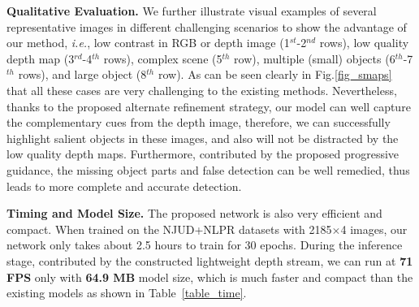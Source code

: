 \documentclass[runningheads]{llncs}
\begin{document}
\textbf{Qualitative Evaluation.} We further illustrate visual examples of several representative images in different challenging scenarios to show the advantage of our method, \textit{i.e.}, low contrast in RGB or depth image (1$^{st}$-2$^{nd}$ rows), low quality depth map (3$^{rd}$-4$^{th}$ rows), complex scene (5$^{th}$ row), multiple (small) objects (6$^{th}$-7$^{th}$ rows), and large object (8$^{th}$ row). As can be seen clearly in Fig.\ref{fig_smaps} that all these cases are very challenging to the existing methods. Nevertheless, thanks to the proposed alternate refinement strategy, our model can well capture the complementary cues from the depth image, therefore, we can successfully highlight salient objects in these images, and also will not be distracted by the low quality depth maps. Furthermore, contributed by the proposed progressive guidance, the missing object parts and false detection can be well remedied, thus leads to more complete and accurate detection.

\textbf{Timing and Model Size.} The proposed network is also very efficient and compact. When trained on the NJUD+NLPR datasets with 2185$\times$4 images, our network only takes about 2.5 hours to train for 30 epochs. During the inference stage, contributed by the constructed lightweight depth stream, we can run at \textbf{71 FPS} only with \textbf{64.9 MB} model size, which is much faster and compact than the existing models as shown in Table~\ref{table_time}.
\end{document}
